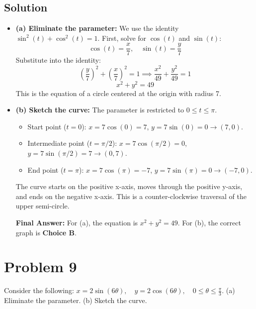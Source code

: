 \documentclass{article}
\begin{document}
\subsection*{Solution}
\begin{itemize}
    \item \textbf{(a) Eliminate the parameter:}
    We use the identity $\sin^2(t) + \cos^2(t) = 1$.
    First, solve for $\cos(t)$ and $\sin(t)$:
    \[ \cos(t) = \frac{x}{7}, \quad \sin(t) = \frac{y}{7} \]
    Substitute into the identity:
    \[ \left(\frac{y}{7}\right)^2 + \left(\frac{x}{7}\right)^2 = 1 \implies \frac{x^2}{49} + \frac{y^2}{49} = 1 \]
    \[ x^2 + y^2 = 49 \]
    This is the equation of a circle centered at the origin with radius 7.

    \item \textbf{(b) Sketch the curve:}
    The parameter is restricted to $0 \le t \le \pi$.
    \begin{itemize}
        \item Start point ($t=0$): $x = 7 \cos(0) = 7$, $y = 7 \sin(0) = 0 \rightarrow (7, 0)$.
        \item Intermediate point ($t=\pi/2$): $x = 7 \cos(\pi/2) = 0$, $y = 7 \sin(\pi/2) = 7 \rightarrow (0, 7)$.
        \item End point ($t=\pi$): $x = 7 \cos(\pi) = -7$, $y = 7 \sin(\pi) = 0 \rightarrow (-7, 0)$.
    \end{itemize}
    The curve starts on the positive x-axis, moves through the positive y-axis, and ends on the negative x-axis. This is a counter-clockwise traversal of the upper semi-circle.

    \textbf{Final Answer:} For (a), the equation is $x^2 + y^2 = 49$. For (b), the correct graph is \textbf{Choice B}.
\end{itemize}

\section{Problem 9}
Consider the following: $x = 2 \sin(6\theta), \quad y = 2 \cos(6\theta), \quad 0 \le \theta \le \frac{\pi}{3}$.
(a) Eliminate the parameter.
(b) Sketch the curve.
\end{document}
